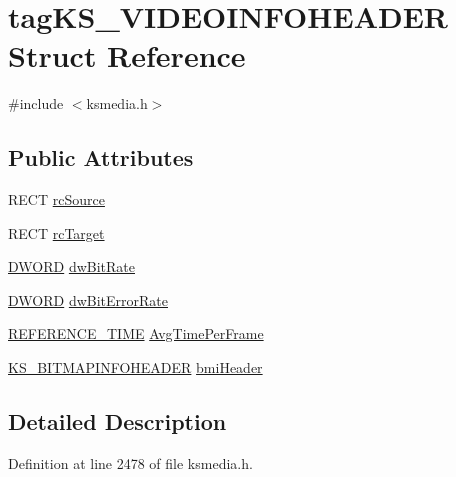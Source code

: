 \hypertarget{structtag_k_s___v_i_d_e_o_i_n_f_o_h_e_a_d_e_r}{}\section{tag\+K\+S\+\_\+\+V\+I\+D\+E\+O\+I\+N\+F\+O\+H\+E\+A\+D\+ER Struct Reference}
\label{structtag_k_s___v_i_d_e_o_i_n_f_o_h_e_a_d_e_r}


{\ttfamily \#include $<$ksmedia.\+h$>$}

\subsection*{Public Attributes}
\begin{DoxyCompactItemize}
\item 
R\+E\+CT \hyperlink{structtag_k_s___v_i_d_e_o_i_n_f_o_h_e_a_d_e_r_a26e81c3d7e1672c344c7f1362e3cde50}{rc\+Source}
\item 
R\+E\+CT \hyperlink{structtag_k_s___v_i_d_e_o_i_n_f_o_h_e_a_d_e_r_a6b8f59c5c1feb9ac4963951800095fbc}{rc\+Target}
\item 
\hyperlink{mapinls_8h_ad342ac907eb044443153a22f964bf0af}{D\+W\+O\+RD} \hyperlink{structtag_k_s___v_i_d_e_o_i_n_f_o_h_e_a_d_e_r_a7ab397ba0ef60a0bb449e045d2acca8d}{dw\+Bit\+Rate}
\item 
\hyperlink{mapinls_8h_ad342ac907eb044443153a22f964bf0af}{D\+W\+O\+RD} \hyperlink{structtag_k_s___v_i_d_e_o_i_n_f_o_h_e_a_d_e_r_a61ee8d4ae605761206b2f35175e036ac}{dw\+Bit\+Error\+Rate}
\item 
\hyperlink{ksmedia_8h_a83927f70641d4e9a344563bd9ddb15ae}{R\+E\+F\+E\+R\+E\+N\+C\+E\+\_\+\+T\+I\+ME} \hyperlink{structtag_k_s___v_i_d_e_o_i_n_f_o_h_e_a_d_e_r_af2bd554ba27dad2c3b2ff72965a9d88c}{Avg\+Time\+Per\+Frame}
\item 
\hyperlink{ksmedia_8h_a6a2b96637a3edc2842d6edf85f090516}{K\+S\+\_\+\+B\+I\+T\+M\+A\+P\+I\+N\+F\+O\+H\+E\+A\+D\+ER} \hyperlink{structtag_k_s___v_i_d_e_o_i_n_f_o_h_e_a_d_e_r_aa82785ce41f3dc2ba18d0cfb168db101}{bmi\+Header}
\end{DoxyCompactItemize}


\subsection{Detailed Description}


Definition at line 2478 of file ksmedia.\+h.




